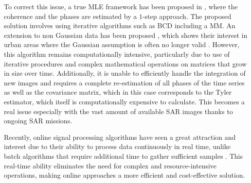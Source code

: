     To correct this issue, a true \ac{MLE} framework has been proposed in \citep{vu2022new}, where the coherence and the phases are estimated by a $1$-step approach. The proposed solution involves using iterative algorithms such as \ac{BCD} including a \ac{MM}. %
    An extension to non Gaussian data has been proposed \citep{vu2023robust}, which shows their interest in urban areas where the Gaussian assumption is often no longer valid \citep{mian2018new}.
    However, this algorithm remains computationally intensive, particularly due to use of iterative procedures and complex mathematical operations on matrices that grow in size over time. %
    Additionally, it is unable to efficiently handle the integration of new images and requires a complete re-estimation of all phases of the time series as well as the covariance matrix, which in this case corresponds to the Tyler estimator, which itself is computationally expensive to calculate. This becomes a real issue especially with the vast amount of available \acs{SAR} images thanks to ongoing \acs{SAR} missions.%
    
    \noindent
    Recently, online signal processing algorithms have seen a great attraction and interest due to their ability to process data continuously in real time, unlike batch algorithms that require additional time to gather sufficient samples \citep{zakharov2008low, angelosante2010online, elvander2016online, zhang2023high}. This real-time ability eliminates the need for complex and resource-intensive operations, making online approaches a more efficient and cost-effective solution. %
    
